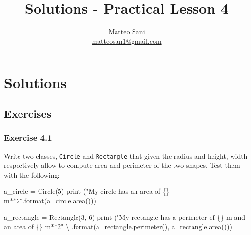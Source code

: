 \documentclass[11pt]{article}
\title{Solutions - Practical Lesson 4}
\author{Matteo Sani \\ \href{mailto:matteosan1@gmail.com}{matteosan1@gmail.com}}
\newenvironment{Shaded}{}{}
\newcommand{\DecValTok}[1]{\textcolor[rgb]{0.25,0.63,0.44}{{#1}}}
\newcommand{\StringTok}[1]{\textcolor[rgb]{0.25,0.44,0.63}{{#1}}}
\newcommand{\NormalTok}[1]{{#1}}
\newcommand{\SpecialCharTok}[1]{\textcolor[rgb]{0.25,0.44,0.63}{{#1}}}
\newcommand{\OperatorTok}[1]{\textcolor[rgb]{0.40,0.40,0.40}{{#1}}}
\newcommand{\BuiltInTok}[1]{{#1}}
\begin{document}
    
    
    \maketitle
    
    

    
    \hypertarget{solutions---practical-lesson-4}{%
\section{Solutions}\label{solutions---practical-lesson-4}}

\hypertarget{exercises}{%
\subsection{Exercises}\label{exercises}}

\hypertarget{exercise-4.1}{%
\subsubsection{Exercise 4.1}\label{exercise-4.1}}

Write two classes, \texttt{Circle} and \texttt{Rectangle} that given the
radius and height, width respectively allow to compute area and
perimeter of the two shapes. Test them with the following:

\begin{Shaded}
\begin{Highlighting}[]
\NormalTok{a_circle }\OperatorTok{=}\NormalTok{ Circle(}\DecValTok{5}\NormalTok{)}
\BuiltInTok{print}\NormalTok{ (}\StringTok{"My circle has an area of }\SpecialCharTok{\{\}}\StringTok{ m**2"}\NormalTok{.}\BuiltInTok{format}\NormalTok{(a_circle.area()))}

\NormalTok{a_rectangle }\OperatorTok{=}\NormalTok{ Rectangle(}\DecValTok{3}\NormalTok{, }\DecValTok{6}\NormalTok{)}
\BuiltInTok{print}\NormalTok{ (}\StringTok{"My rectangle has a perimeter of }\SpecialCharTok{\{\}}\StringTok{ m and an area of }\SpecialCharTok{\{\}}\StringTok{ m**2"}\NormalTok{ \textbackslash{}}
\NormalTok{    .}\BuiltInTok{format}\NormalTok{(a_rectangle.perimeter(), a_rectangle.area()))}
\end{Highlighting}
\end{Shaded}
\end{document}
